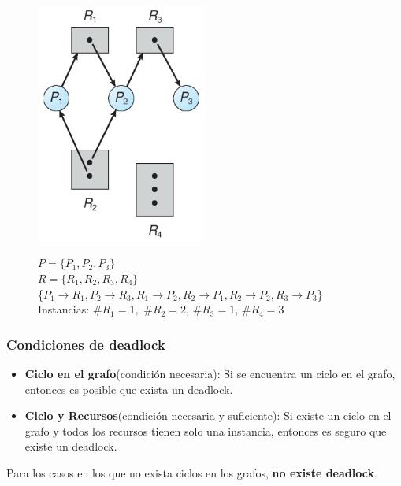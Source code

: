 \documentclass{templateNote}
\begin{document}
\begin{figure}[H]
    \centering
    \includegraphics[width=0.5\textwidth]{img/grafo1.png}
    
    $P = \{P_1 , P_2 , P_3\}$\\
    $R = \{R_1 , R_2 , R_3 , R_4\}$\\
    \{$ P_1 \rightarrow R_1 , P_2 \rightarrow R_3 , R_1 \rightarrow P_2 , R_2 \rightarrow P_1 , R_2 \rightarrow P_2 , R_3 \rightarrow P_3 $\}\\
    Instancias: \#$R_1 = 1,$ \#$R_2 = 2$, \#$R_3 = 1$, \#$R_4 = 3$
\end{figure}

\subsubsection*{Condiciones de deadlock}
\begin{itemize}
    \item \textbf{Ciclo en el grafo}(condición necesaria): Si se encuentra un ciclo en el grafo, entonces es posible que exista un deadlock.
    \item \textbf{Ciclo y Recursos}(condición necesaria y suficiente): Si existe un ciclo en el grafo y todos los recursos tienen solo una instancia, entonces es seguro que existe un deadlock.
\end{itemize}
Para los casos en los que no exista ciclos en los grafos, \textbf{no existe deadlock}.
\end{document}
